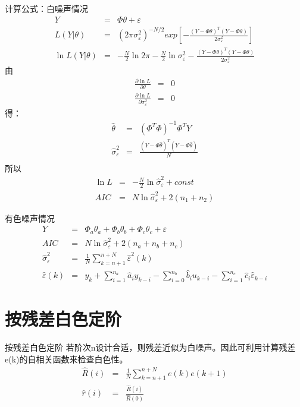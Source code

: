 \begin{frame}{计算公式：白噪声情况}
\begin{eqnarray*}
Y &=& \Phi\theta+\varepsilon  \\
L(Y|\theta) &=& (2\pi\sigma_\varepsilon^2)^{-N/2}exp\left[-\frac{(Y-\Phi\theta)^T(Y-\Phi\theta)}{2\sigma_\varepsilon^2}\right] \\
\ln L(Y|\theta) &=& -\frac{N}{2}\ln 2\pi -\frac{N}{2}\ln\sigma_\varepsilon^2-\frac{(Y-\Phi\theta)^T(Y-\Phi\theta)}{2\sigma_\varepsilon^2}
\end{eqnarray*}
由
\begin{eqnarray*}
\frac{\partial \ln L}{\partial\theta} &=& 0 \\
\frac{\partial \ln L}{\partial\sigma_\varepsilon^2} &=& 0 
\end{eqnarray*}
得：
\begin{eqnarray*}
\hat\theta &=& (\Phi^T\Phi)^{-1}\Phi^T Y \\
\hat\sigma_\varepsilon^2 &=& \frac{(Y-\Phi\hat\theta)^T(Y-\Phi\hat\theta)}{N} \\
\end{eqnarray*}
所以
\begin{eqnarray*}
\ln L &=& -\frac{N}{2}\ln\hat\sigma_\varepsilon^2+const \\
AIC &=& N\ln\hat\sigma_\varepsilon^2+2(n_1+n_2)
\end{eqnarray*}
\end{frame}

\begin{frame}{有色噪声情况}
\begin{eqnarray*}
Y&=&\Phi_a\theta_a+\Phi_b\theta_b+\Phi_c\theta_c+\varepsilon \\
AIC &=& N\ln\hat\sigma_\varepsilon^2+2(n_a+n_b+n_c) \\
\hat\sigma_\varepsilon^2 &=& \frac{1}{N}\sum_{k=n+1}^{n+N}\hat\varepsilon^2(k) \\
\hat\varepsilon(k) &=& y_k+\sum_{i=1}^{n_a}\hat a_i y_{k-i}-\sum_{i=0}^{n_b}\hat b_i u_{k-i}-\sum_{i=1}^{n_c}\hat c_i \hat\varepsilon_{k-i}
\end{eqnarray*}
\end{frame}


\section{按残差白色定阶}
\begin{frame}{按残差白色定阶}
若阶次n设计合适，则残差近似为白噪声。因此可利用计算残差e(k)的自相关函数来检查白色性。 
\begin{eqnarray*}
\hat R(i) &=& \frac{1}{N}\sum_{k=n+1}^{n+N}e(k)e(k+1) \\
\hat r(i) &=& \frac{\hat R(i) }{\hat R(0)}
\end{eqnarray*}
\end{frame}

